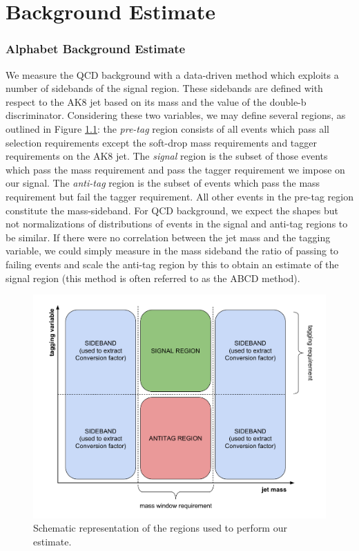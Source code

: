 \chapter{Background Estimate}\label{Sec:Bkg}

\subsection{Alphabet Background Estimate\label{ss:Alphabet}}
We measure the QCD background with a data-driven method which exploits a number of sidebands of the signal region. These sidebands are defined with respect to the AK8 jet based on its mass and the value of the double-b discriminator. Considering these two variables, we may define several regions, as outlined in Figure \ref{F:ABCDEFregions}: the \textit{pre-tag} region consists of all events which pass all selection requirements except the soft-drop mass requirements and tagger requirements on the AK8 jet. The \textit{signal} region is the subset of those events which pass the mass requirement and pass the tagger requirement we impose on our signal. The \textit{anti-tag} region is the subset of events which pass the mass requirement but fail the tagger requirement. All other events in the pre-tag region constitute the mass-sideband. For QCD background, we expect the shapes but not normalizations of distributions of events in the signal and anti-tag regions to be similar. If there were no correlation between the jet mass and the tagging variable, we could simply measure in the mass sideband the ratio of passing to failing events and scale the anti-tag region by this to obtain an estimate of the signal region (this method is often referred to as the ABCD method).
\begin{figure}[h!]
  \centering
    \includegraphics[width=\textwidth]{F5/pretag2.pdf}
  \caption{Schematic representation of the regions used to perform our estimate.} \label{F:ABCDEFregions}
\end{figure}

